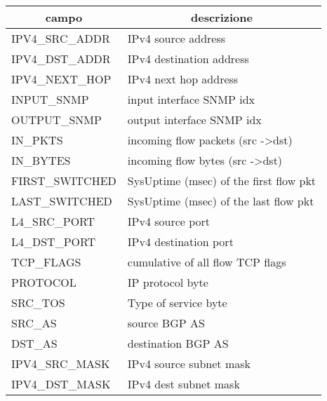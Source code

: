 \documentclass[../main.tex]{subfiles}
\begin{document}
\begin{table}[H]
\begin{tabular}{|l|l|}
\hline
\multicolumn{1}{|c|}{\textbf{campo}} & \multicolumn{1}{c|}{\textbf{descrizione}}     \\ \hline
IPV4\_SRC\_ADDR                      & IPv4 source address                           \\ \hline
IPV4\_DST\_ADDR                      & IPv4 destination address                      \\ \hline
IPV4\_NEXT\_HOP                      & IPv4 next hop address                         \\ \hline
INPUT\_SNMP                          & input interface SNMP idx                      \\ \hline
OUTPUT\_SNMP                         & output interface SNMP idx                     \\ \hline
IN\_PKTS                             & incoming flow packets (src -\textgreater dst) \\ \hline
IN\_BYTES                            & incoming flow bytes (src -\textgreater dst)   \\ \hline
FIRST\_SWITCHED                      & SysUptime (msec) of the first flow pkt        \\ \hline
LAST\_SWITCHED                       & SysUptime (msec) of the last flow pkt         \\ \hline
L4\_SRC\_PORT                        & IPv4 source port                              \\ \hline
L4\_DST\_PORT                        & IPv4 destination port                         \\ \hline
TCP\_FLAGS                           & cumulative of all flow TCP flags              \\ \hline
PROTOCOL                             & IP protocol byte                              \\ \hline
SRC\_TOS                             & Type of service byte                          \\ \hline
SRC\_AS                              & source BGP AS                                 \\ \hline
DST\_AS                              & destination BGP AS                            \\ \hline
IPV4\_SRC\_MASK                      & IPv4 source subnet mask                       \\ \hline
IPV4\_DST\_MASK                      & IPv4 dest subnet mask                         \\ \hline

\end{tabular}
\end{table}
\end{document}
